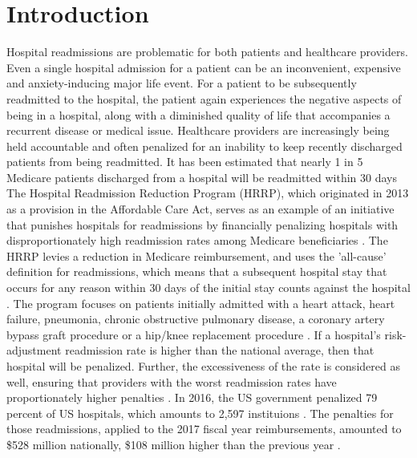 \documentclass[sigconf]{acmart}
\begin{document}


\maketitle

\section{Introduction}

Hospital readmissions are problematic for both patients and healthcare providers. Even a single hospital admission for a patient can be an inconvenient, expensive and anxiety-inducing major life event. For a patient to be subsequently readmitted to the hospital, the patient again experiences the negative aspects of being in a hospital, along with a diminished quality of life that accompanies a recurrent disease or medical issue. Healthcare providers are increasingly being held accountable and often penalized for an inability to keep recently discharged patients from being readmitted. It has been estimated that nearly 1 in 5 Medicare patients discharged from a hospital will be readmitted within 30 days \cite{cite05}
The Hospital Readmission Reduction Program (HRRP), which originated in 2013 as a provision in the Affordable Care Act, serves as an example of an initiative that punishes hospitals for readmissions by financially penalizing hospitals with disproportionately high readmission rates among Medicare beneficiaries \cite{cite06}. The HRRP levies a reduction in Medicare reimbursement, and uses the 'all-cause' definition for readmissions, which means that a subsequent hospital stay that occurs for any reason within 30 days of the initial stay counts against the hospital \cite{cite06}. The program focuses on patients initially admitted with a heart attack, heart failure, pneumonia, chronic obstructive pulmonary disease, a coronary artery bypass graft procedure or a hip/knee replacement procedure \cite{cite06}. If a hospital's risk-adjustment readmission rate is higher than the national average, then that hospital will be penalized. Further, the excessiveness of the rate is considered as well, ensuring that providers with the worst readmission rates have proportionately higher penalties \cite{cite06}. In 2016, the US government penalized 79 percent of US hospitals, which amounts to 2,597 instituions \cite{cite00}. The penalties for those readmissions, applied to the 2017 fiscal year reimbursements, amounted to \$528 million nationally, \$108 million higher than the previous year \cite{cite00}. 
\end{document}
